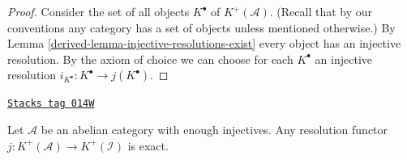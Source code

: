 \begin{proof}

Consider the set of all objects $K^\bullet$ of $K^{+}(\mathcal{A})$.
(Recall that by our conventions any category has a set of
objects unless mentioned otherwise.)
By Lemma \ref{derived-lemma-injective-resolutions-exist} every object
has an injective resolution.
By the axiom of choice we can choose for each $K^\bullet$
an injective resolution $i_{K^\bullet} : K^\bullet \to j(K^\bullet)$.
\end{proof}

\begin{lemma}[J is exact]
\label{derived-lemma-j-is-exact}
\href{https://stacks.math.columbia.edu/tag/014W}{\texttt{Stacks tag 014W}}

Let $\mathcal{A}$ be an abelian category with enough injectives.
Any resolution functor
$j : K^{+}(\mathcal{A}) \to K^{+}(\mathcal{I})$
is exact.
\end{lemma}

